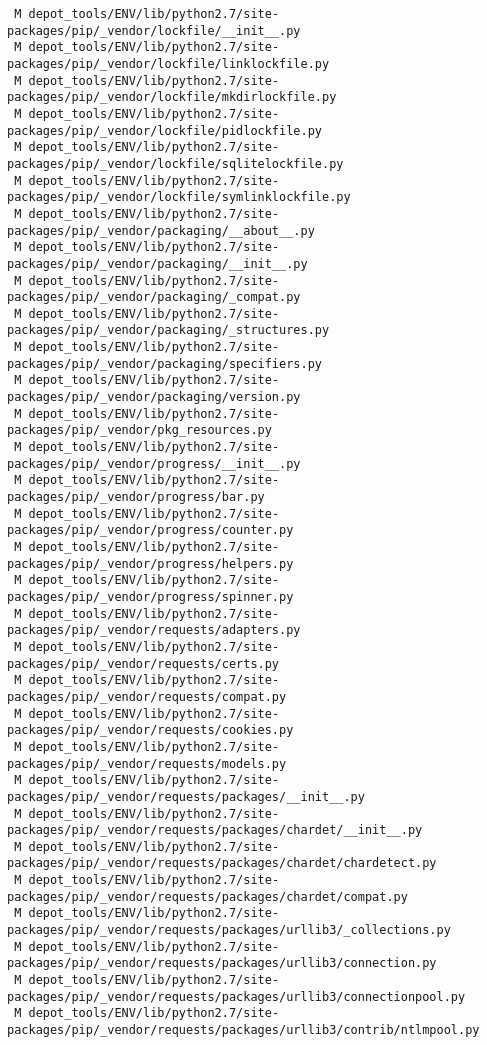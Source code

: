 \documentclass{article}
\begin{document}
\begin{verbatim}
 M depot_tools/ENV/lib/python2.7/site-packages/pip/_vendor/lockfile/__init__.py
 M depot_tools/ENV/lib/python2.7/site-packages/pip/_vendor/lockfile/linklockfile.py
 M depot_tools/ENV/lib/python2.7/site-packages/pip/_vendor/lockfile/mkdirlockfile.py
 M depot_tools/ENV/lib/python2.7/site-packages/pip/_vendor/lockfile/pidlockfile.py
 M depot_tools/ENV/lib/python2.7/site-packages/pip/_vendor/lockfile/sqlitelockfile.py
 M depot_tools/ENV/lib/python2.7/site-packages/pip/_vendor/lockfile/symlinklockfile.py
 M depot_tools/ENV/lib/python2.7/site-packages/pip/_vendor/packaging/__about__.py
 M depot_tools/ENV/lib/python2.7/site-packages/pip/_vendor/packaging/__init__.py
 M depot_tools/ENV/lib/python2.7/site-packages/pip/_vendor/packaging/_compat.py
 M depot_tools/ENV/lib/python2.7/site-packages/pip/_vendor/packaging/_structures.py
 M depot_tools/ENV/lib/python2.7/site-packages/pip/_vendor/packaging/specifiers.py
 M depot_tools/ENV/lib/python2.7/site-packages/pip/_vendor/packaging/version.py
 M depot_tools/ENV/lib/python2.7/site-packages/pip/_vendor/pkg_resources.py
 M depot_tools/ENV/lib/python2.7/site-packages/pip/_vendor/progress/__init__.py
 M depot_tools/ENV/lib/python2.7/site-packages/pip/_vendor/progress/bar.py
 M depot_tools/ENV/lib/python2.7/site-packages/pip/_vendor/progress/counter.py
 M depot_tools/ENV/lib/python2.7/site-packages/pip/_vendor/progress/helpers.py
 M depot_tools/ENV/lib/python2.7/site-packages/pip/_vendor/progress/spinner.py
 M depot_tools/ENV/lib/python2.7/site-packages/pip/_vendor/requests/adapters.py
 M depot_tools/ENV/lib/python2.7/site-packages/pip/_vendor/requests/certs.py
 M depot_tools/ENV/lib/python2.7/site-packages/pip/_vendor/requests/compat.py
 M depot_tools/ENV/lib/python2.7/site-packages/pip/_vendor/requests/cookies.py
 M depot_tools/ENV/lib/python2.7/site-packages/pip/_vendor/requests/models.py
 M depot_tools/ENV/lib/python2.7/site-packages/pip/_vendor/requests/packages/__init__.py
 M depot_tools/ENV/lib/python2.7/site-packages/pip/_vendor/requests/packages/chardet/__init__.py
 M depot_tools/ENV/lib/python2.7/site-packages/pip/_vendor/requests/packages/chardet/chardetect.py
 M depot_tools/ENV/lib/python2.7/site-packages/pip/_vendor/requests/packages/chardet/compat.py
 M depot_tools/ENV/lib/python2.7/site-packages/pip/_vendor/requests/packages/urllib3/_collections.py
 M depot_tools/ENV/lib/python2.7/site-packages/pip/_vendor/requests/packages/urllib3/connection.py
 M depot_tools/ENV/lib/python2.7/site-packages/pip/_vendor/requests/packages/urllib3/connectionpool.py
 M depot_tools/ENV/lib/python2.7/site-packages/pip/_vendor/requests/packages/urllib3/contrib/ntlmpool.py

\end{verbatim}
\end{document}
